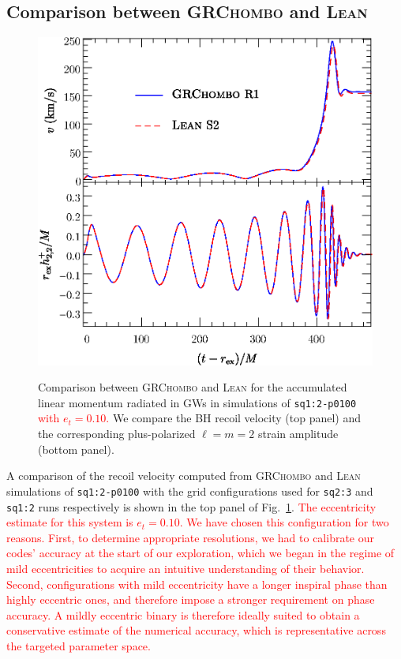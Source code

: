 \documentclass[floats,floatfix,showpacs,amssymb,prd,twocolumn,superscriptaddress,nofootinbib,nolongbibliography,reprint]{revtex4-2}
\newcommand{\mr}[1]{{\textcolor{cyan}{\sf{[MR: #1]}} }}
\newcommand{\new}[1]{{\textcolor{red}{ #1} }}
\begin{document}
\subsection{Comparison between \textsc{GRChombo} and \textsc{Lean}}
\label{sec:code-comparison}
\begin{figure}[t]
    {
    \centering
    \includegraphics[width=\columnwidth]{grchombo-lean-comparison3.eps}
    }
    \caption{Comparison between \textsc{GRChombo} and \textsc{Lean} 
    for the accumulated linear momentum radiated in GWs in simulations 
    of \texttt{sq1:2-p0100} \new{with $e_t=0.10$.}
    We compare the BH recoil velocity (top panel)
    and the corresponding plus-polarized $\ell=m=2$ strain
    amplitude (bottom panel).
    }
    \label{fig:grchombo-lean-comparison}
\end{figure}
A comparison of the recoil velocity computed from \textsc{GRChombo} 
and \textsc{Lean} simulations of \texttt{sq1:2-p0100} with the grid 
configurations used for \texttt{sq2:3} and \texttt{sq1:2} runs 
respectively is shown in the top panel of Fig.~\ref{fig:grchombo-lean-comparison}.
\new{The eccentricity estimate for this system is $e_t=0.10$. We have chosen
this configuration for two reasons. First, to determine appropriate
resolutions, we had to calibrate our codes' accuracy at the start of
our exploration, which we began in the regime of mild eccentricities to
acquire an intuitive understanding of their behavior. Second, 
configurations with mild eccentricity have a longer inspiral phase
than highly eccentric ones, and therefore impose a stronger requirement
on phase accuracy. A mildly eccentric binary is therefore ideally suited
to obtain a conservative estimate of the numerical accuracy, which is representative across the targeted parameter space.}
\end{document}
